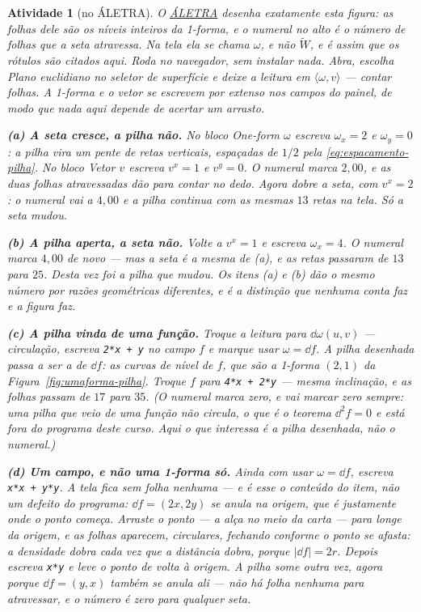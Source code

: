 \documentclass[12pt,a4paper,oneside]{book}
\theoremstyle{rgplain}
\newtheorem{activity}{Atividade}[chapter]
\theoremstyle{rgremark}
\begin{document}
\begin{activity}[no ÁLETRA]
\label{atv:pilha-aletra}
O \href{\rgsitealetra}{ÁLETRA} desenha exatamente esta figura: as folhas dele
são os níveis inteiros da 1-forma, e o numeral no alto é o número de folhas
que a seta atravessa. Na tela ela se chama $\omega$, e não $\tilde W$, e é
assim que os rótulos são citados aqui. Roda no navegador, sem instalar nada. Abra, escolha
\textsf{Plano euclidiano} no seletor de superfície e deixe a leitura em
\textsf{$\langle\omega,v\rangle$ --- contar folhas}. A 1-forma e o vetor se
escrevem por extenso nos campos do painel, de modo que nada aqui depende de
acertar um arrasto.

\textbf{(a) A seta cresce, a pilha não.} No bloco \textsf{One-form $\omega$}
escreva $\omega_x=2$ e $\omega_y=0$: a pilha vira um pente de retas verticais,
espaçadas de $1/2$ pela \eqref{eq:espacamento-pilha}. No bloco
\textsf{Vetor $v$} escreva $v^x=1$ e $v^y=0$. O numeral marca $2{,}00$, e as
duas folhas atravessadas dão para contar no dedo. Agora dobre a seta, com
$v^x=2$: o numeral vai a $4{,}00$ e a pilha continua com as mesmas $13$ retas
na tela. Só a seta mudou.

\textbf{(b) A pilha aperta, a seta não.} Volte a $v^x=1$ e escreva
$\omega_x=4$. O numeral marca $4{,}00$ de novo --- mas a seta é a mesma de (a),
e as retas passaram de $13$ para $25$. Desta vez foi a pilha que mudou. Os
itens (a) e (b) dão o mesmo número por razões geométricas diferentes, e é a
distinção que nenhuma conta faz e a figura faz.

\textbf{(c) A pilha vinda de uma função.} Troque a leitura para
\textsf{$\dd\omega(u,v)$ --- circulação}, escreva \texttt{2*x + y} no campo
$f$ e marque \textsf{usar $\omega=\dd f$}. A pilha desenhada passa a ser a de
$\dd f$: as curvas de nível de $f$, que são a 1-forma $(2,1)$ da
Figura~\ref{fig:umaforma-pilha}. Troque $f$ para \texttt{4*x + 2*y} --- mesma
inclinação, e as folhas passam de $17$ para $35$. (O numeral marca zero, e vai
marcar zero sempre: uma pilha que veio de uma função não circula, o que é o
teorema $\dd^2f=0$ e está fora do programa deste curso. Aqui o que interessa é
a pilha desenhada, não o numeral.)

\textbf{(d) Um campo, e não uma 1-forma só.} Ainda com \textsf{usar
$\omega=\dd f$}, escreva \texttt{x*x + y*y}. \emph{A tela fica sem folha
nenhuma} --- e é esse o conteúdo do item, não um defeito do programa:
$\dd f=(2x,2y)$ se anula na origem, que é justamente onde o ponto começa.
Arraste o ponto --- a alça no meio da carta --- para longe da origem, e as
folhas aparecem, circulares, fechando conforme o ponto se afasta: a densidade
dobra cada vez que a distância dobra, porque $|\dd f|=2r$. Depois escreva
\texttt{x*y} e leve o ponto de volta à origem. A pilha some outra vez, agora
porque $\dd f=(y,x)$ também se anula ali --- não há folha nenhuma para
atravessar, e o número é zero para qualquer seta.
\end{activity}
\end{document}
